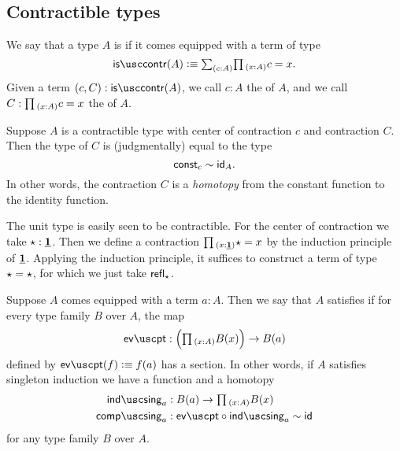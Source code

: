 \subsection{Contractible types}

\begin{defn}
  We say that a type $A$ is  if it comes equipped with a term of type
  \begin{equation*}
    \iscontr(A) \defeq \sm{c:A}\prd{x:A}c=x.
  \end{equation*}
  Given a term $(c,C):\iscontr(A)$, we call $c:A$ the  of $A$, and we call $C:\prd{x:A}c=x$ the  of $A$.
\end{defn}

\begin{rmk}
Suppose $A$ is a contractible type with center of contraction $c$ and contraction $C$. Then the type of $C$ is (judgmentally) equal to the type
\begin{equation*}
\const_c\htpy\idfunc[A].
\end{equation*}
In other words, the contraction $C$ is a \emph{homotopy} from the constant function to the identity function.
\end{rmk}

\begin{eg}
  The unit type is easily seen to be contractible. For the center of contraction we take $\ttt:\unit$. Then we define a contraction $\prd{x:\unit}\ttt=x$ by the induction principle of $\unit$. Applying the induction principle, it suffices to construct a term of type $\ttt = \ttt$, for which we just take $\refl{\ttt}$.
\end{eg}

\begin{defn}
  Suppose $A$ comes equipped with a term $a:A$. Then we say that $A$ satisfies  if for every type family $B$ over $A$, the map
  \begin{equation*}
    \evpt:\Big(\prd{x:A}B(x)\Big)\to B(a)
  \end{equation*}
  defined by $\evpt(f)\defeq f(a)$ has a section. In other words, if $A$ satisfies singleton induction we have a function and a homotopy
  \begin{align*}
    \singind_{a} & : B(a)\to \prd{x:A}B(x) \\
    \singcomp_{a} & : \evpt\circ \singind_{a} \htpy \idfunc
  \end{align*}
  for any type family $B$ over $A$.
\end{defn}

